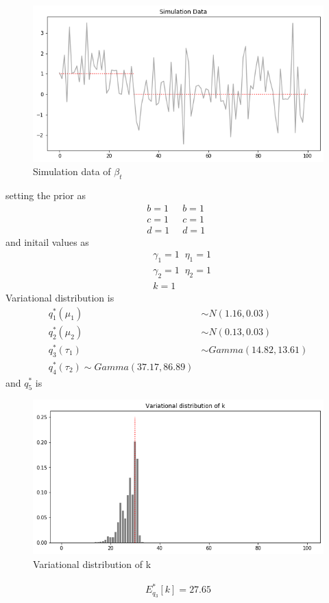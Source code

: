 \documentclass[11pt]{article}
\begin{document}
	\begin{figure} [h]
		\centering
		\includegraphics[width=1.0\linewidth]{simulation}
		\caption{Simulation data of $\beta_t$}
		\label{fig:Simulation}
	\end{figure}

	setting the prior as 
	\begin{align*}
	b = 1\;\;&
	b = 1\;\;\\
	c = 1\;\;&
	c = 1\;\;\\
	d = 1\;\;&
	d = 1
	\end{align*}
	and initail values as
	\begin{align*}
	&\gamma_1 = 1 \;\; \eta_1 = 1 \\
	&\gamma_2 = 1 \;\; \eta_2 = 1 \\
	&k=1
	\end{align*}
	Variational distribution is
	\begin{align*}
	q_1^*(\mu_1) &\sim N(1.16, 0.03)\\
	q_2^*(\mu_2) &\sim N(0.13, 0.03)\\
	q_3^*(\tau_1) &\sim Gamma(14.82, 13.61)\\
	q_4^*(\tau_2) \sim Gamma(37.17,86.89)
	\end{align*}
	and $q_5^*$ is
	\begin{figure} [h]
		\centering
		\includegraphics[width=1.0\linewidth]{kproba}
		\caption{Variational distribution of k}
		\label{fig:kproba}
	\end{figure}
	
	
	\begin{align*}
	E_{q_3}^*[k] = 27.65
	\end{align*}
\end{document}
